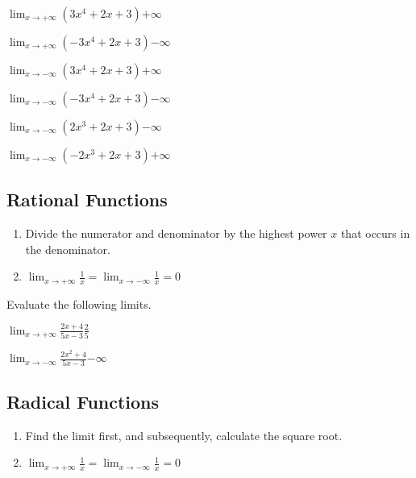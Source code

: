 \problemans%
{$\displaystyle \lim_{x\rightarrow+\infty} (3x^4 + 2x + 3)$}{$+\infty$}

\problemans%
{$\displaystyle \lim_{x\rightarrow+\infty} (-3x^4 + 2x + 3)$}{$-\infty$}

\problemans%
{$\displaystyle \lim_{x\rightarrow-\infty} (3x^4 + 2x + 3)$}{$+\infty$}

\problemans%
{$\displaystyle \lim_{x\rightarrow-\infty} (-3x^4 + 2x + 3)$}{$-\infty$}

\problemans%
{$\displaystyle \lim_{x\rightarrow-\infty} (2x^3 + 2x + 3)$}{$-\infty$}

\problemans%
{$\displaystyle \lim_{x\rightarrow-\infty} (-2x^3 + 2x + 3)$}{$+\infty$}


\makenewpage\subsection{Rational Functions}
\begin{myframe}[arc=10pt,auto outer arc]
	\begin{enumerate}
		\item Divide the numerator and denominator by the highest power $x$ that occurs in the denominator.
		\item $\displaystyle \lim_{x\rightarrow+\infty} \frac{1}{x} = \lim_{x\rightarrow-\infty} \frac{1}{x} = 0$
	\end{enumerate}
\end{myframe}

\noindent Evaluate the following limits.

\problemans%
{$\displaystyle \lim_{x\rightarrow+\infty} \frac{2x + 4}{5x - 3}$}{$\frac{2}{5}$}

\problemans%
{$\displaystyle \lim_{x\rightarrow-\infty} \frac{2x^2 + 4}{5x - 3}$}{$-\infty$}


\makenewpage\subsection{Radical Functions}
\begin{myframe}[arc=10pt,auto outer arc]
	\begin{enumerate}
		\item Find the limit first, and subsequently, calculate the square root.
		\item $\displaystyle \lim_{x\rightarrow+\infty} \frac{1}{x} = \lim_{x\rightarrow-\infty} \frac{1}{x} = 0$
	\end{enumerate}
\end{myframe}


